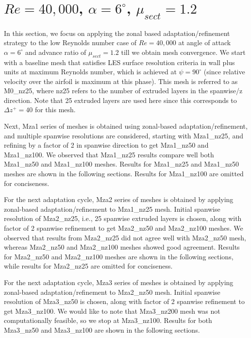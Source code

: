 \section{ $Re=40,000$,  $\alpha=6^\circ$, $\mu_{sect}=1.2$}

In this section, we focus on applying the zonal based adaptation/refinement strategy to the low Reynolds number case of $Re=40,000$ at angle of attack $\alpha=6^\circ$ and advance ratio of $\mu_{sect}=1.2$ till we obtain mesh convergence.
We start with a baseline mesh that satisfies LES surface resolution criteria in wall plus units at maximum Reynolds number, which is achieved at $\psi=90^\circ$ (since relative velocity over the airfoil is maximum at this phase). 
This mesh is referred to as M0\_nz25, where nz25 refers to the number of extruded layers in the spanwise/z direction. Note that 25 extruded layers are used here since this corresponds to $\Delta z^+ = 40$ for this mesh.

Next, Mza1 series of meshes is obtained using zonal-based adaptation/refinement, and multiple spanwise resolutions are considered, starting with Mza1\_nz25, and refining by a factor of 2 in spanwise direction to get Mza1\_nz50 and Mza1\_nz100.
We observed that Mza1\_nz25 results compare well both Mza1\_nz50 and Mza1\_nz100 meshes.
Results for Mza1\_nz25 and Mza1\_nz50 meshes are shown in the following sections.
Results for Mza1\_nz100 are omitted for conciseness.

For the next adaptation cycle, Mza2 series of meshes is obtained by applying  zonal-based adaptation/refinement to Mza1\_nz25 mesh.
Initial spanwise resolution of Mza2\_nz25, i.e., 25 spanwise extruded layers is chosen, along with factor of 2 spanwise refinement to get Mza2\_nz50 and Mza2\_nz100 meshes. 
We observed that results from Mza2\_nz25 did not agree well with Mza2\_nz50 mesh, whereas Mza2\_nz50 and Mza2\_nz100 meshes showed good agreement.
Results for Mza2\_nz50 and Mza2\_nz100 meshes are shown in the following sections, while results for Mza2\_nz25 are omitted for conciseness.

For the next adaptation cycle, Mza3 series of meshes is obtained by applying  zonal-based adaptation/refinement to Mza2\_nz50 mesh. 
Initial spanwise resolution of Mza3\_nz50 is chosen, along with factor of 2 spanwise refinement to get Mza3\_nz100. 
We would like to note that Mza3\_nz200 mesh was not computationally feasible, so we stop at Mza3\_nz100.
Results for both Mza3\_nz50 and Mza3\_nz100 are shown in the following sections.

